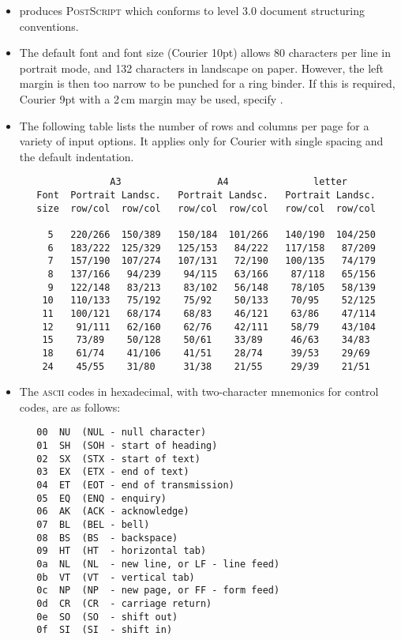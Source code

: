 \begin{itemize}
\item
    produces \textsc{PostScript} which conforms to level 3.0
   document structuring conventions.

\item
   The default font and font size (Courier 10pt) allows 80 characters per line
   in portrait mode, and 132 characters in landscape on  paper.
   However, the left margin is then too narrow to be punched for a ring
   binder.  If this is required, Courier 9pt with a 2\,cm margin may be used,
   specify  .

\item
   The following table lists the number of rows and columns per page for a
   variety of input options.  It applies only for Courier with single spacing
   and the default indentation.

\begin{verbatim}
                A3                 A4               letter
   Font  Portrait Landsc.   Portrait Landsc.   Portrait Landsc.
   size  row/col  row/col   row/col  row/col   row/col  row/col

     5   220/266  150/389   150/184  101/266   140/190  104/250
     6   183/222  125/329   125/153   84/222   117/158   87/209
     7   157/190  107/274   107/131   72/190   100/135   74/179
     8   137/166   94/239    94/115   63/166    87/118   65/156
     9   122/148   83/213    83/102   56/148    78/105   58/139
    10   110/133   75/192    75/92    50/133    70/95    52/125
    11   100/121   68/174    68/83    46/121    63/86    47/114
    12    91/111   62/160    62/76    42/111    58/79    43/104
    15    73/89    50/128    50/61    33/89     46/63    34/83
    18    61/74    41/106    41/51    28/74     39/53    29/69
    24    45/55    31/80     31/38    21/55     29/39    21/51
\end{verbatim}

\item
   The \textsc{ascii} codes in hexadecimal, with two-character mnemonics for
   control codes, are as follows:

\begin{verbatim}
   00  NU  (NUL - null character)
   01  SH  (SOH - start of heading)
   02  SX  (STX - start of text)
   03  EX  (ETX - end of text)
   04  ET  (EOT - end of transmission)
   05  EQ  (ENQ - enquiry)
   06  AK  (ACK - acknowledge)
   07  BL  (BEL - bell)
   08  BS  (BS  - backspace)
   09  HT  (HT  - horizontal tab)
   0a  NL  (NL  - new line, or LF - line feed)
   0b  VT  (VT  - vertical tab)
   0c  NP  (NP  - new page, or FF - form feed)
   0d  CR  (CR  - carriage return)
   0e  SO  (SO  - shift out)
   0f  SI  (SI  - shift in)


\end{verbatim}
\end{itemize}
